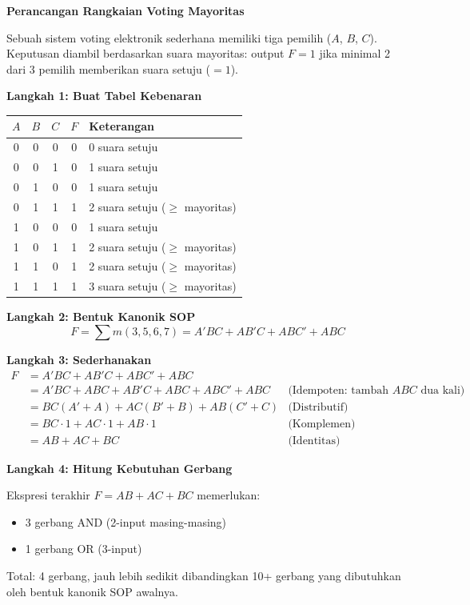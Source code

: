 \begin{contoh}
\textbf{Perancangan Rangkaian Voting Mayoritas}

Sebuah sistem voting elektronik sederhana memiliki tiga pemilih ($A$, $B$, $C$). Keputusan diambil berdasarkan suara mayoritas: output $F = 1$ jika minimal 2 dari 3 pemilih memberikan suara setuju ($= 1$).

\textbf{Langkah 1: Buat Tabel Kebenaran}

\begin{center}
\begin{tabular}{|c|c|c||c|l|}
\hline
$A$ & $B$ & $C$ & $F$ & \textbf{Keterangan} \\ \hline
0 & 0 & 0 & 0 & 0 suara setuju \\ \hline
0 & 0 & 1 & 0 & 1 suara setuju \\ \hline
0 & 1 & 0 & 0 & 1 suara setuju \\ \hline
0 & 1 & 1 & 1 & 2 suara setuju ($\geq$ mayoritas) \\ \hline
1 & 0 & 0 & 0 & 1 suara setuju \\ \hline
1 & 0 & 1 & 1 & 2 suara setuju ($\geq$ mayoritas) \\ \hline
1 & 1 & 0 & 1 & 2 suara setuju ($\geq$ mayoritas) \\ \hline
1 & 1 & 1 & 1 & 3 suara setuju ($\geq$ mayoritas) \\ \hline
\end{tabular}
\end{center}

\textbf{Langkah 2: Bentuk Kanonik SOP}
\[ F = \sum m(3, 5, 6, 7) = A'BC + AB'C + ABC' + ABC \]

\textbf{Langkah 3: Sederhanakan}
\begin{align*}
F &= A'BC + AB'C + ABC' + ABC \\
  &= A'BC + ABC + AB'C + ABC + ABC' + ABC & \text{(Idempoten: tambah } ABC \text{ dua kali)} \\
  &= BC(A' + A) + AC(B' + B) + AB(C' + C) & \text{(Distributif)} \\
  &= BC \cdot 1 + AC \cdot 1 + AB \cdot 1 & \text{(Komplemen)} \\
  &= AB + AC + BC & \text{(Identitas)}
\end{align*}

\textbf{Langkah 4: Hitung Kebutuhan Gerbang}

Ekspresi terakhir $F = AB + AC + BC$ memerlukan:
\begin{itemize}
    \item 3 gerbang AND (2-input masing-masing)
    \item 1 gerbang OR (3-input)
\end{itemize}
Total: 4 gerbang, jauh lebih sedikit dibandingkan 10+ gerbang yang dibutuhkan oleh bentuk kanonik SOP awalnya.
\end{contoh}

